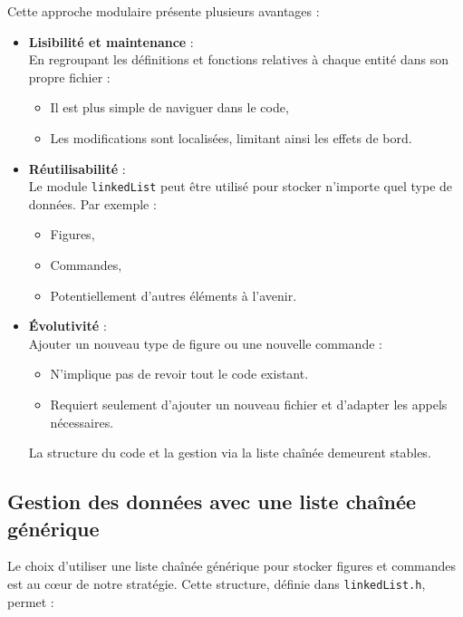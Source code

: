\documentclass[12pt,a4paper]{article}
\begin{document}
Cette approche modulaire présente plusieurs avantages :
\begin{itemize}
    \item \textbf{Lisibilité et maintenance} : \\
    En regroupant les définitions et fonctions relatives à chaque entité dans son propre fichier :
    \begin{itemize}
        \item Il est plus simple de naviguer dans le code,
        \item Les modifications sont localisées, limitant ainsi les effets de bord.
    \end{itemize}

    \item \textbf{Réutilisabilité} : \\
    Le module \texttt{linkedList} peut être utilisé pour stocker n’importe quel type de données. Par exemple :
    \begin{itemize}
        \item Figures,
        \item Commandes,
        \item Potentiellement d’autres éléments à l’avenir.
    \end{itemize}

    \item \textbf{Évolutivité} : \\
    Ajouter un nouveau type de figure ou une nouvelle commande :
    \begin{itemize}
        \item N’implique pas de revoir tout le code existant.
        \item Requiert seulement d’ajouter un nouveau fichier et d’adapter les appels nécessaires.
    \end{itemize}
    La structure du code et la gestion via la liste chaînée demeurent stables.
\end{itemize}

\subsection{Gestion des données avec une liste chaînée générique}
Le choix d’utiliser une liste chaînée générique pour stocker figures et commandes est au cœur de notre stratégie. Cette structure, définie dans \texttt{linkedList.h}, permet :
\end{document}
